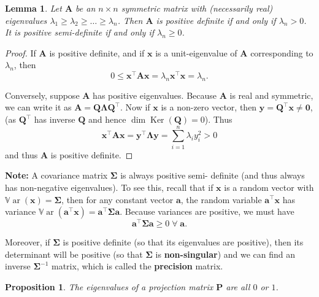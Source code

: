 \documentclass[]{book}
\newtheorem{lemma}{Lemma}[chapter]
\newtheorem{proposition}{Proposition}[chapter]
\theoremstyle{definition}
\theoremstyle{definition}
\theoremstyle{definition}
\theoremstyle{remark}
\begin{document}
\begin{lemma}
\protect\hypertarget{lem:eigposdef}{}{\label{lem:eigposdef} }Let \(\mathbf A\) be an \(n \times n\) symmetric matrix
with (necessarily real) eigenvalues \(\lambda _1 \geq \lambda _2 \geq \dots \geq \lambda _n\). Then \(\mathbf A\) is \emph{positive definite}
if and only if \(\lambda _n >0\). It is positive semi-definite if and only if \(\lambda_n \geq 0\).
\end{lemma}
\begin{proof}
{}If \(\mathbf A\) is positive definite, and if \(\mathbf x\) is a unit-eigenvalue of \(\mathbf A\) corresponding to \(\lambda_n\), then
\[0\leq \mathbf x^\top \mathbf A\mathbf x= \lambda_n \mathbf x^\top \mathbf x= \lambda_n.\]

Conversely, suppose \(\mathbf A\) has positive eigenvalues. Because \(\mathbf A\) is real and symmetric, we can write it as \(\mathbf A=\mathbf Q\boldsymbol \Lambda\mathbf Q^\top\). Now if \(\mathbf x\) is a non-zero vector, then \(\mathbf y= \mathbf Q^\top \mathbf x\not= \boldsymbol 0\), (as \(\mathbf Q^\top\) has inverse \(\mathbf Q\) and hence \(\dim \operatorname{Ker}(\mathbf Q)=0\)). Thus
\[\mathbf x^\top \mathbf A\mathbf x= \mathbf y^\top \boldsymbol \Lambda\mathbf y= \sum_{i=1}^n \lambda_i y_i^2 >0\] and thus \(\mathbf A\) is positive definite.
\end{proof}

\textbf{Note:} A covariance matrix \(\boldsymbol{\Sigma}\) is always positive semi-
definite (and thus always has non-negative eigenvalues). To see this, recall that if \(\mathbf x\) is a random vector with \({\mathbb{V}\operatorname{ar}}(\mathbf x)=\boldsymbol{\Sigma}\), then for any constant vector \(\mathbf a\), the random variable \(\mathbf a^\top \mathbf x\) has variance \({\mathbb{V}\operatorname{ar}}(\mathbf a^\top \mathbf x)=\mathbf a^\top \boldsymbol{\Sigma}\mathbf a\). Because variances are positive, we must have
\[\mathbf a^\top \boldsymbol{\Sigma}\mathbf a\geq 0 \;\forall \;\mathbf a.\]

Moreover, if \(\boldsymbol{\Sigma}\) is positive definite (so that its eigenvalues are positive), then its
determinant will be positive (so that \(\boldsymbol{\Sigma}\) is \textbf{non-singular}) and we can find an inverse \(\boldsymbol{\Sigma}^{-1}\) matrix, which is called the \textbf{precision} matrix.

\begin{proposition}
\protect\hypertarget{prp:eigproj}{}{\label{prp:eigproj} }The eigenvalues of a projection matrix \(\mathbf P\) are all \(0\) or \(1\).
\end{proposition}
\end{document}
